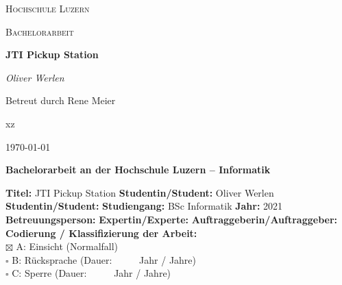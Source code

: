 
		{\scshape\LARGE Hochschule Luzern\par}
		\vspace{1cm}
		{\scshape\Large Bachelorarbeit\par}
		\vspace{1.5cm}
		{\huge\bfseries JTI Pickup Station\par}
		\vspace{1.5cm}
		{\Large\itshape Oliver Werlen\par}
		
		\vfill
		Betreut durch Rene Meier \par
		xz
		\vfill
		{\large \today\par}
	\newpage
	
	\noindent
	\fontsize{12}{14}
	\textbf{Bachelorarbeit an der Hochschule Luzern -- Informatik} \\ \vspace*{0.6cm}
	
	\fontsize{10.5}{12}
	\noindent
	\textbf{Titel: } JTI Pickup Station \newline \newline
	\textbf{Studentin/Student:} Oliver Werlen \newline \newline
	\textbf{Studentin/Student:} \newline \newline
	\textbf{Studiengang:} BSc Informatik \newline \newline
	\textbf{Jahr:} 2021\newline \newline
	\textbf{Betreuungsperson:} \newline \newline
	\textbf{Expertin/Experte:} \newline \newline
	\textbf{Auftraggeberin/Auftraggeber:} \newline \newline \newline
	\textbf{Codierung / Klassifizierung der Arbeit:}\\
	$\boxtimes$ A: Einsicht 	(Normalfall) \\
	$\square$ B: R\"ucksprache	(Dauer:  \ \ \ \ \     Jahr / Jahre)\\
	$\square$ C: Sperre	(Dauer:  \ \ \ \ \     Jahr / Jahre)\\
	
